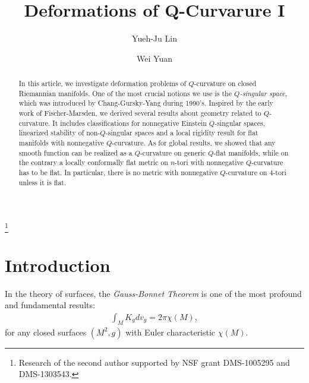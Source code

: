 \documentclass[12pt]{amsart}
\theoremstyle{definition}
\theoremstyle{remark}
\numberwithin{equation}{section}
\begin{document}
\title{Deformations of Q-Curvarure I}

\author{Yueh-Ju Lin}
\address{(Yueh-Ju Lin) Department of Mathematics, University of Michgan, Ann Arbor, MI 48109, USA}

\author{Wei Yuan}
\address{(Wei Yuan) School of Mathematics and Computational Science, Sun Yat-sen University, Guangzhou, Guangdong 510275, China}


\thanks{Research of the second author supported by NSF grant DMS-1005295 and DMS-1303543.}

\begin{abstract}
In this article, we investigate deformation problems of $Q$-curvature on closed Riemannian manifolds. One of the most crucial notions we use is the \emph{$Q$-singular space}, which was introduced by Chang-Gursky-Yang during 1990's. Inspired by the early work of Fischer-Marsden, we derived several results about geometry related to $Q$-curvature. It includes classifications for nonnegative Einstein $Q$-singular spaces, linearized stability of non-$Q$-singular spaces and a local rigidity result for flat manifolds with nonnegative $Q$-curvature. As for global results, we showed that any smooth function can be realized as a $Q$-curvature on generic $Q$-flat manifolds, while on the contrary a locally conformally flat metric on $n$-tori with nonnegative $Q$-curvature has to be flat. In particular, there is no metric with nonnegative $Q$-curvature on $4$-tori unless it is flat.
\end{abstract}

\maketitle

\section{Introduction}

In the theory of surfaces, the \emph{Gauss-Bonnet Theorem} is one of the most profound and fundamental results: 
\begin{align}\label{eqn:Gauss-Bonnet}
\int_M K_g dv_g = 2\pi \chi (M),
\end{align}
 for any closed surfaces $(M^2 ,g)$ with Euler characteristic $\chi (M)$. \\
\end{document}
